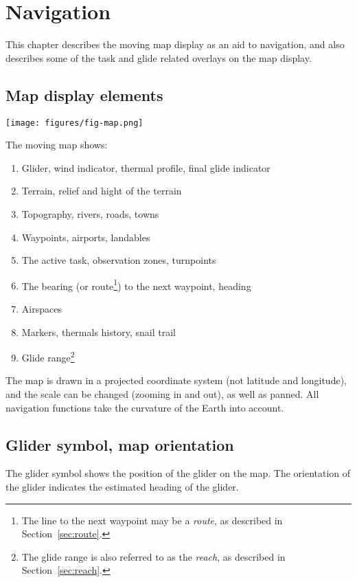 \chapter{Navigation}\label{cha:navigation}
This chapter describes the moving map display as an aid to navigation,
and also describes some of the task and glide related overlays on the
map display.

\section{Map display elements}

\begin{maxipage}
\texttt{[image: figures/fig-map.png]}
\end{maxipage}

The moving map shows:
\begin{enumerate} 
\item Glider, wind indicator, thermal profile, final glide indicator
\item Terrain, relief and hight of the terrain
\item Topography, rivers, roads, towns
\item Waypoints, airports, landables
\item The active task, observation zones, turnpoints
\item The bearing (or route\footnote{The line to the next waypoint may be a 
  \emph{route}, as described in Section~\ref{sec:route}.}) to the next waypoint, 
  heading
\item Airspaces
\item Markers, thermals history, snail trail
\item Glide range\footnote{The glide range is also referred to as the 
  \emph{reach}, as described in Section~\ref{sec:reach}.}
\end{enumerate}
The map is drawn in a projected coordinate system (not latitude and
longitude), and the scale can be changed (zooming in and out), as well
as panned.  All navigation functions take the curvature of the Earth
into account.

\section{Glider symbol, map orientation}
The glider symbol shows the position of the glider on the map.  The
orientation of the glider indicates the estimated heading of the
glider.

